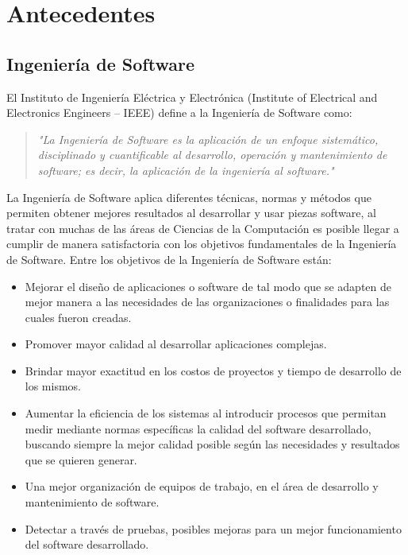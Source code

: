 \chapter{Antecedentes}
    \label{cha:Antecedentes}

     \section{Ingeniería de Software}

 El Instituto de Ingeniería Eléctrica y Electrónica (Institute of Electrical and Electronics Engineers – IEEE) define a la Ingeniería de Software como:

\begin{quote}
\textit{"La Ingeniería de Software\cite{IeeeSG} es la aplicación de un enfoque sistemático, disciplinado y cuantificable al desarrollo, operación y mantenimiento de software; es decir, la aplicación de la ingeniería al software."}
\end{quote}

La Ingeniería de Software aplica diferentes técnicas, normas y métodos que permiten obtener mejores resultados al desarrollar y usar piezas software, al tratar con muchas de las áreas de Ciencias de la Computación es posible llegar a cumplir de manera satisfactoria con los objetivos fundamentales de la Ingeniería de Software. Entre los objetivos de la Ingeniería de Software están\cite{enSWE}:

\begin{itemize}
\item Mejorar el diseño de aplicaciones o software de tal modo que se adapten de mejor manera a las necesidades de las organizaciones o finalidades para las cuales fueron creadas.
\item Promover mayor calidad al desarrollar aplicaciones complejas.
\item Brindar mayor exactitud en los costos de proyectos y tiempo de desarrollo de los mismos.
\item Aumentar la eficiencia de los sistemas al introducir procesos que permitan medir mediante normas específicas la calidad del software desarrollado, buscando siempre la mejor calidad posible según las necesidades y resultados que se quieren generar.
\item Una mejor organización de equipos de trabajo, en el área de desarrollo y mantenimiento de software.
\item Detectar a través de pruebas, posibles mejoras para un mejor funcionamiento del software desarrollado.
\end{itemize} 

